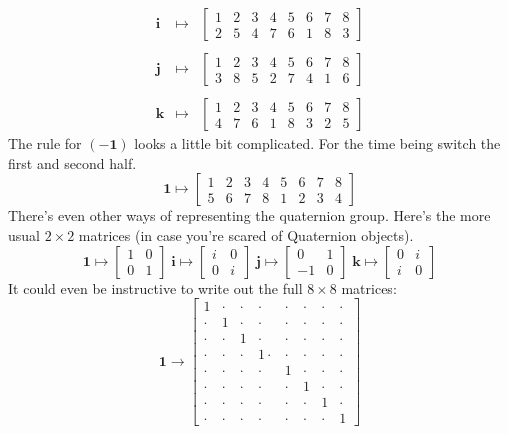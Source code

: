 \documentclass[12pt]{article}
\newcommand{\one}{\mathbf{1}}
\newcommand{\ii}{\mathbf{i}}
\newcommand{\jj}{\mathbf{j}}
\newcommand{\kk}{\mathbf{k}}
\begin{document}
\begin{eqnarray*}
\ii &\mapsto& \left[\begin{array}{cccccccc} 1 & 2 & 3 & 4 & 5 & 6 & 7 & 8 \\
 2 & 5 & 4 & 7 & 6 & 1 & 8 & 3  \end{array} \right] \\ \\
\jj &\mapsto& \left[\begin{array}{cccccccc} 1 & 2 & 3 & 4 & 5 & 6 & 7 & 8 \\
3 & 8 & 5 & 2 & 7 & 4 & 1 & 6 \end{array} \right] \\ \\
\kk &\mapsto& \left[\begin{array}{cccccccc} 1 & 2 & 3 & 4 & 5 & 6 & 7 & 8 \\
4 & 7 & 6 & 1 & 8 & 3 & 2 & 5 \end{array} \right] 
\end{eqnarray*}
The rule for $(-\one)$ looks a little bit complicated.  For the time being switch the first and second half.
$$
\one \mapsto \left[\begin{array}{cccccccc} 1 & 2 & 3 & 4 & 5 & 6 & 7 & 8 \\
5 & 6 & 7 & 8 & 1 & 2 & 3 & 4   \end{array} \right]
 $$ 
\newpage 
\noindent There's even other ways of representing the quaternion group.  Here's the more usual $2 \times 2$ matrices (in case you're scared of Quaternion objects).
$$
\one \mapsto \left[ \begin{array}{cc} 1 & 0 \\ 0 & 1 \end{array} \right] \;
\ii \mapsto \left[ \begin{array}{cc} i & 0 \\ 0 & i \end{array} \right]  \;
\jj \mapsto \left[ \begin{array}{rr} 0 & 1 \\ -1 & 0 \end{array} \right]  \;
\kk \mapsto \left[ \begin{array}{rr} 0 & i \\ i & 0 \end{array} \right] $$
It could even be instructive to write out the full $8 \times 8$ matrices:
$$  \one \to \left[ \begin{array}{cccccccc} 
1 & \cdot & \cdot  & \cdot  & \cdot  & \cdot  & \cdot  & \cdot  \\
\cdot & 1 & \cdot & \cdot & \cdot & \cdot & \cdot & \cdot \\
\cdot & \cdot & 1 & \cdot & \cdot & \cdot & \cdot & \cdot \\
\cdot &\cdot & \cdot & 1 \cdot & \cdot & \cdot & \cdot & \cdot \\
\cdot & \cdot & \cdot & \cdot & 1 & \cdot & \cdot & \cdot \\
\cdot & \cdot & \cdot & \cdot & \cdot & 1 & \cdot & \cdot  \\
\cdot & \cdot &  \cdot & \cdot & \cdot & \cdot &  1 & \cdot \\
\cdot & \cdot & \cdot & \cdot & \cdot & \cdot & \cdot &  1 \end{array} \right]$$
\end{document}
